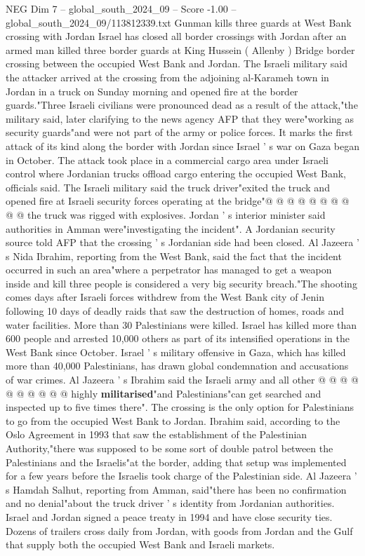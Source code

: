 \begin{textsample}{NEG Dim 7 – global\_south\_2024\_09 – Score -1.00 – global\_south\_2024\_09/113812339.txt}  \label{ex:f7_neg_226}
Gunman kills three guards at West Bank crossing with Jordan Israel has closed all border crossings with Jordan after an armed man killed three border guards at King Hussein ( Allenby ) Bridge border crossing between the occupied West Bank and Jordan.
The Israeli military said the attacker arrived at the crossing from the adjoining al-Karameh town in Jordan in a truck on Sunday morning and opened fire at the border guards."Three Israeli civilians were pronounced dead as a result of the attack,"the military said, later clarifying to the news agency AFP that they were"working as security guards"and were not part of the army or police forces.
It marks the first attack of its kind along the border with Jordan since Israel ' s war on Gaza began in October.
The attack took place in a commercial cargo area under Israeli control where Jordanian trucks offload cargo entering the occupied West Bank, officials said.
The Israeli military said the truck driver"exited the truck and opened fire at Israeli security forces operating at the bridge"@ @ @ @ @ @ @ @ @ @ the truck was rigged with explosives.
Jordan ' s interior minister said authorities in Amman were"investigating the incident".
A Jordanian security source told AFP that the crossing ' s Jordanian side had been closed.
Al Jazeera ' s Nida Ibrahim, reporting from the West Bank, said the fact that the incident occurred in such an area"where a perpetrator has managed to get a weapon inside and kill three people is considered a very big security breach."The shooting comes days after Israeli forces withdrew from the West Bank city of Jenin following 10 days of deadly raids that saw the destruction of homes, roads and water facilities.
More than 30 Palestinians were killed.
Israel has killed more than 600 people and arrested 10,000 others as part of its intensified operations in the West Bank since October.
Israel ' s military offensive in Gaza, which has killed more than 40,000 Palestinians, has drawn global condemnation and accusations of war crimes.
Al Jazeera ' s Ibrahim said the Israeli army and all other @ @ @ @ @ @ @ @ @ @ highly \textbf{militarised}"and Palestinians"can get searched and inspected up to five times there".
The crossing is the only option for Palestinians to go from the occupied West Bank to Jordan.
Ibrahim said, according to the Oslo Agreement in 1993 that saw the establishment of the Palestinian Authority,"there was supposed to be some sort of double patrol between the Palestinians and the Israelis"at the border, adding that setup was implemented for a few years before the Israelis took charge of the Palestinian side.
Al Jazeera ' s Hamdah Salhut, reporting from Amman, said"there has been no confirmation and no denial"about the truck driver ' s identity from Jordanian authorities.
Israel and Jordan signed a peace treaty in 1994 and have close security ties.
Dozens of trailers cross daily from Jordan, with goods from Jordan and the Gulf that supply both the occupied West Bank and Israeli markets.

\end{textsample}
